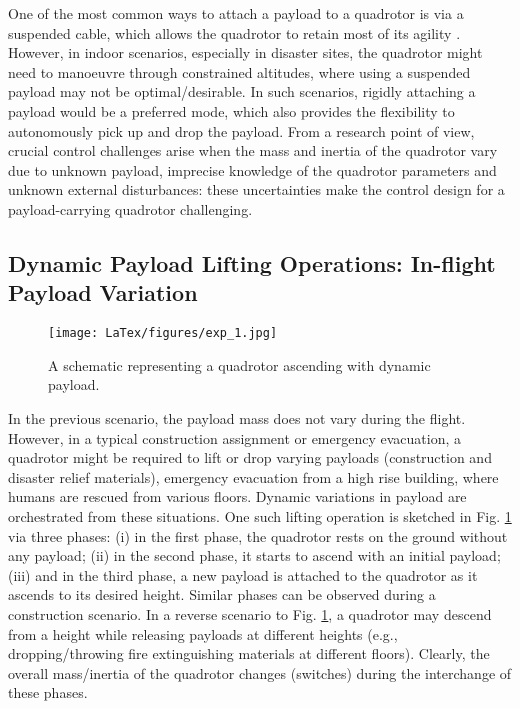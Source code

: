 One of the most common ways to attach a payload to a quadrotor is via a suspended cable, which allows the quadrotor to retain most of its agility \cite{tang2015mixed, sreenath2013trajectory, yang2019energy}. However, in indoor scenarios, especially in disaster sites, the quadrotor might need to manoeuvre through constrained altitudes, where using a suspended payload may not be optimal/desirable. In such scenarios, rigidly attaching a payload would be a preferred mode, which also provides the flexibility to autonomously pick up and drop the payload. From a research point of view, crucial control challenges arise when the mass and inertia of the quadrotor vary due to unknown payload, imprecise knowledge of the quadrotor parameters and unknown external disturbances: these uncertainties make the control design for a payload-carrying quadrotor challenging. %

\subsection{Dynamic Payload Lifting Operations: In-flight Payload Variation}\label{motive_2}
\begin{figure}[!h]
	\centering
	\texttt{[image: LaTex/figures/exp\_1.jpg]}%
	\caption{{A schematic representing a quadrotor ascending with dynamic payload.}}\label{fig:mot} %
\end{figure}
In the previous scenario, the payload mass does not vary during the flight. However, in a typical construction assignment or emergency evacuation, a quadrotor might be required to lift or drop varying payloads (construction and disaster relief materials), emergency evacuation from a high rise building, where humans are rescued from various floors. Dynamic variations in payload are orchestrated from these situations. One such lifting operation is sketched in Fig. \ref{fig:mot} via three phases: (i) in the first phase, the quadrotor rests on the ground without any payload; (ii) in the second phase, it starts to ascend with an initial payload; (iii) and in the third phase, a new payload is attached to the quadrotor as it ascends to its desired height. Similar phases can be observed during a construction scenario. In a reverse scenario to Fig. \ref{fig:mot}, a quadrotor may descend from a height while releasing payloads at different heights (e.g., dropping/throwing fire extinguishing materials at different floors). Clearly, the overall mass/inertia of the quadrotor changes (switches) during the interchange of these phases. 

